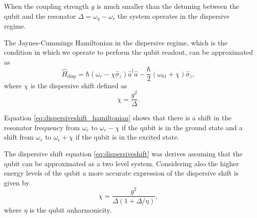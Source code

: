 When the coupling strength $g$ is much smaller than the detuning between the qubit and the resonator $\Delta = \omega_q -\omega_r $ the system operates in the dispersive regime.

The Jaynes-Cummings Hamiltonian in the dispersive regime, which is the condition in which we operate to perform the qubit readout, can be approximated as 
\begin{equation}\label{eq:dispersiveshift_hamiltonian}
    \hat{H}_{\text{disp}} = \hbar (\omega_r - \chi \hat{\sigma}_z) \hat{a}^\dagger \hat{a} - \frac{\hbar}{2} (\omega_{01} + \chi) \hat{\sigma}_z,
\end{equation}
where $\chi$ is the dispersive shift defined as \begin{equation}\label{eq:dispersiveshift}
    \chi = \frac{g^2}{\Delta}.
\end{equation}

Equation \ref{eq:dispersiveshift_hamiltonian} shows that there is a shift in the resonator frequency from $\omega_r$ to $\omega_r - \chi$ if the qubit is in the ground state and a shift from $\omega_r$ to $\omega_r + \chi$ if the qubit is in the excited state.

The dispersive shift equation \ref{eq:dispersiveshift} was derives assuming that the qubit can be approximated as a two level system.
Considering also the higher energy levels of the qubit a more accurate expression of the dispersive shift is given by 
\begin{equation}
    \chi = \frac{g^2}{\Delta(1+\Delta/\eta)},
\end{equation} 
where $\eta$ is the qubit anharmonicity.


